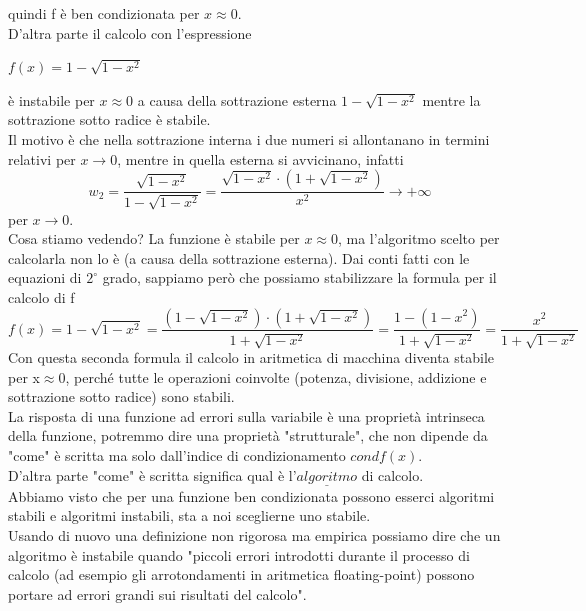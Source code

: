 \documentclass[12pt]{article}
\begin{document}
quindi f è ben condizionata per $x\approx0$.\\ D'altra parte il calcolo con l'espressione\\
\begin{center}
    $f(x)=1-\sqrt{1-x^2}$
\end{center}
è instabile per $x\approx 0$ a causa della sottrazione esterna $1-\sqrt{1-x^2}$
mentre la sottrazione sotto radice è stabile.\\
Il motivo è che nella sottrazione interna i due numeri si allontanano in termini relativi per $x \to 0$, mentre in quella esterna si avvicinano, infatti
\begin{equation}
        w_2 = \frac{\sqrt{1-x^2}}{1-\sqrt{1-x^2}} = \frac{\sqrt{1-x^2}\cdot (1+\sqrt{1-x^2})}{x^2} \to +\infty
\end{equation}
per $x\to 0$.\\
Cosa stiamo vedendo? La funzione è stabile per $x\approx 0$, ma l'algoritmo scelto per calcolarla non lo è (a causa della sottrazione esterna). Dai conti fatti con le equazioni di $2^\circ$ grado, sappiamo però che possiamo stabilizzare la formula per il calcolo di f
\begin{equation}
        f(x) = 1-\sqrt{1-x^2} = \frac{(1-\sqrt{1-x^2})\cdot (1+\sqrt{1-x^2})}{1+\sqrt{1-x^2}}=\frac{1-(1-x^2)}{1+\sqrt{1-x^2}}=\frac{x^2}{1+\sqrt{1-x^2}}
\end{equation}
Con questa seconda formula il calcolo in aritmetica di macchina diventa stabile per x$\approx$0, perché tutte le operazioni coinvolte (potenza, divisione, addizione e sottrazione sotto radice) sono stabili.\\La risposta di una funzione ad errori sulla variabile è una proprietà intrinseca della funzione, potremmo dire una proprietà "strutturale", che non dipende da "come" è scritta ma solo dall'indice di
condizionamento $cond f(x)$.\\ D'altra parte "come" è scritta significa qual è l'$\underline{algoritmo}$ di calcolo.\\
Abbiamo visto che per una funzione ben condizionata possono esserci algoritmi stabili e algoritmi instabili, sta a noi sceglierne uno stabile.\\ Usando di nuovo una definizione non rigorosa ma empirica possiamo dire che un algoritmo è instabile quando
"piccoli errori introdotti durante il processo di calcolo (ad esempio gli arrotondamenti in aritmetica floating-point) possono portare ad errori grandi sui risultati del calcolo".\\
\end{document}
